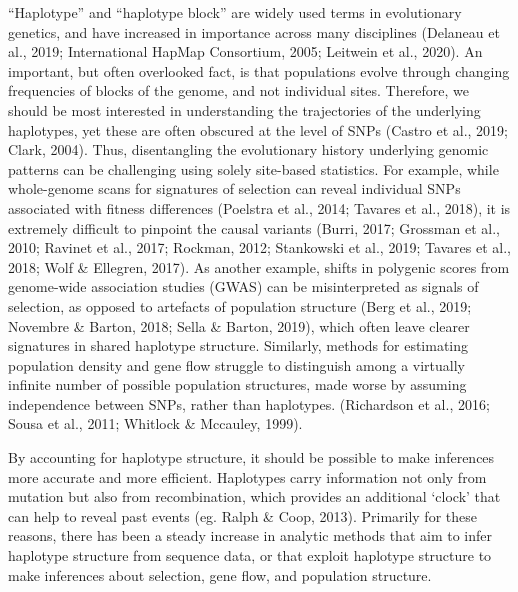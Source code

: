 \documentclass[twocolumn]{bmcart}%
\begin{document}
“Haplotype” and “haplotype block” are widely used terms in evolutionary genetics, and have increased in importance across many disciplines (Delaneau et al., 2019; International HapMap Consortium, 2005; Leitwein et al., 2020). An important, but often overlooked fact, is that populations evolve through changing frequencies of blocks of the genome, and not individual sites. Therefore, we should be most interested in understanding the trajectories of the underlying haplotypes, yet these are often obscured at the level of SNPs (Castro et al., 2019; Clark, 2004). Thus, disentangling the evolutionary history underlying genomic patterns can be challenging using solely site-based statistics. For example, while whole-genome scans for signatures of selection can reveal individual SNPs associated with fitness differences (Poelstra et al., 2014; Tavares et al., 2018), it is extremely difficult to pinpoint the causal variants (Burri, 2017; Grossman et al., 2010; Ravinet et al., 2017; Rockman, 2012; Stankowski et al., 2019; Tavares et al., 2018; Wolf \& Ellegren, 2017). As another example, shifts in polygenic scores from genome-wide association studies (GWAS) can be misinterpreted as signals of selection, as opposed to artefacts of population structure (Berg et al., 2019; Novembre \& Barton, 2018; Sella \& Barton, 2019), which often leave clearer signatures in shared haplotype structure. Similarly, methods for estimating population density and gene flow struggle to distinguish among a virtually infinite number of possible population structures, made worse by assuming independence between SNPs, rather than haplotypes.  (Richardson et al., 2016; Sousa et al., 2011; Whitlock \& Mccauley, 1999). 

By accounting for haplotype structure, it should be possible to make inferences more accurate and more efficient. Haplotypes carry information not only from mutation but also from recombination, which provides an additional ‘clock’ that can help to reveal past events (eg. Ralph \& Coop, 2013). Primarily for these reasons, there has been a steady increase in analytic methods that aim to infer haplotype structure from sequence data, or that exploit haplotype structure to make inferences about selection, gene flow, and population structure.
\end{document}
